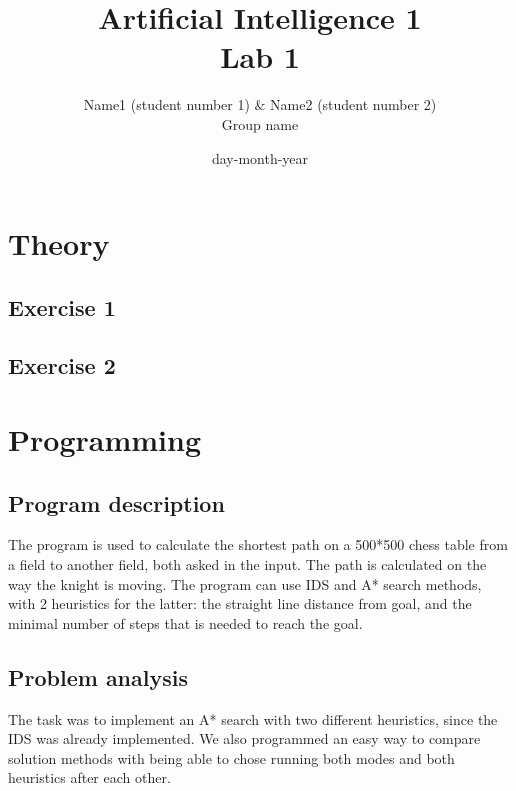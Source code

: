\documentclass{article}
\title{Artificial Intelligence 1 \\ Lab 1}%
\author{Name1 (student number 1) \& Name2 (student number 2) \\ Group name} %
\date{day-month-year}%
\begin{document}
\maketitle

\section*{Theory}
\subsection*{Exercise 1}

\subsection*{Exercise 2}


\section*{Programming} 
\subsection*{Program description}

The program is used to calculate the shortest path on a 500*500 chess table from a field to another field, both asked in the input. The path is calculated on the way the knight is moving. The program can use IDS and A* search methods, with 2 heuristics for the latter: the straight line distance from goal, and the minimal number of steps that is needed to reach the goal.

\subsection*{Problem analysis}

The task was to implement an A* search with two different heuristics, since the IDS was already implemented. We also programmed an easy way to compare solution methods with being able to chose running both modes and both heuristics after each other.
\end{document}
